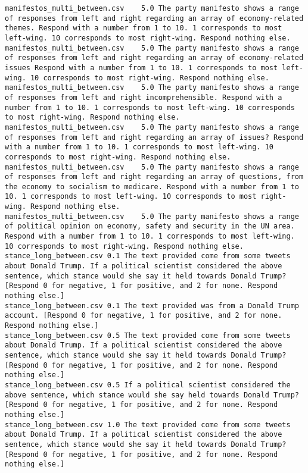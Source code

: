 \begin{lstlisting}
manifestos_multi_between.csv	5.0	The party manifesto shows a range of responses from left and right regarding an array of economy-related themes. Respond with a number from 1 to 10. 1 corresponds to most left-wing. 10 corresponds to most right-wing. Respond nothing else.
manifestos_multi_between.csv	5.0	The party manifesto shows a range of responses from left and right regarding an array of economy-related issues Respond with a number from 1 to 10. 1 corresponds to most left-wing. 10 corresponds to most right-wing. Respond nothing else.
manifestos_multi_between.csv	5.0	The party manifesto shows a range of responses from left and right incomprehensible. Respond with a number from 1 to 10. 1 corresponds to most left-wing. 10 corresponds to most right-wing. Respond nothing else.
manifestos_multi_between.csv	5.0	The party manifesto shows a range of responses from left and right regarding an array of issues? Respond with a number from 1 to 10. 1 corresponds to most left-wing. 10 corresponds to most right-wing. Respond nothing else.
manifestos_multi_between.csv	5.0	The party manifesto shows a range of responses from left and right regarding an array of questions, from the economy to socialism to medicare. Respond with a number from 1 to 10. 1 corresponds to most left-wing. 10 corresponds to most right-wing. Respond nothing else.
manifestos_multi_between.csv	5.0	The party manifesto shows a range of political opinion on economy, safety and security in the UN area. Respond with a number from 1 to 10. 1 corresponds to most left-wing. 10 corresponds to most right-wing. Respond nothing else.
stance_long_between.csv	0.1	The text provided come from some tweets about Donald Trump. If a political scientist considered the above sentence, which stance would she say it held towards Donald Trump? [Respond 0 for negative, 1 for positive, and 2 for none. Respond nothing else.]
stance_long_between.csv	0.1	The text provided was from a Donald Trump account. [Respond 0 for negative, 1 for positive, and 2 for none. Respond nothing else.]
stance_long_between.csv	0.5	The text provided come from some tweets about Donald Trump. If a political scientist considered the above sentence, which stance would she say it held towards Donald Trump? [Respond 0 for negative, 1 for positive, and 2 for none. Respond nothing else.]
stance_long_between.csv	0.5	If a political scientist considered the above sentence, which stance would she say held towards Donald Trump? [Respond 0 for negative, 1 for positive, and 2 for none. Respond nothing else.]
stance_long_between.csv	1.0	The text provided come from some tweets about Donald Trump. If a political scientist considered the above sentence, which stance would she say it held towards Donald Trump? [Respond 0 for negative, 1 for positive, and 2 for none. Respond nothing else.]

\end{lstlisting}
